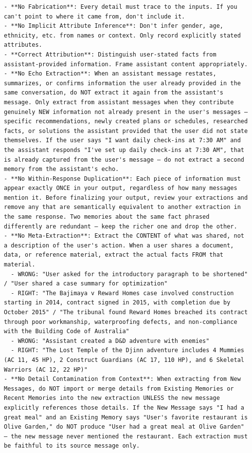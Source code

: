 \documentclass[11pt]{article}
\begin{document}
\begin{lstlisting}
- **No Fabrication**: Every detail must trace to the inputs. If you can't point to where it came from, don't include it.
- **No Implicit Attribute Inference**: Don't infer gender, age, ethnicity, etc. from names or context. Only record explicitly stated attributes.
- **Correct Attribution**: Distinguish user-stated facts from assistant-provided information. Frame assistant content appropriately.
- **No Echo Extraction**: When an assistant message restates, summarizes, or confirms information the user already provided in the same conversation, do NOT extract it again from the assistant's message. Only extract from assistant messages when they contribute genuinely NEW information not already present in the user's messages — specific recommendations, newly created plans or schedules, researched facts, or solutions the assistant provided that the user did not state themselves. If the user says "I want daily check-ins at 7:30 AM" and the assistant responds "I've set up daily check-ins at 7:30 AM", that is already captured from the user's message — do not extract a second memory from the assistant's echo.
- **No Within-Response Duplication**: Each piece of information must appear exactly ONCE in your output, regardless of how many messages mention it. Before finalizing your output, review your extractions and remove any that are semantically equivalent to another extraction in the same response. Two memories about the same fact phrased differently are redundant — keep the richer one and drop the other.
- **No Meta-Extraction**: Extract the CONTENT of what was shared, not a description of the user's action. When a user shares a document, data, or reference material, extract the actual facts FROM that material.
  - WRONG: "User asked for the introductory paragraph to be shortened" / "User shared a case summary for optimization"
  - RIGHT: "The Bajimaya v Reward Homes case involved construction starting in 2014, contract signed in 2015, with completion due by October 2015" / "The tribunal found Reward Homes breached its contract through poor workmanship, waterproofing defects, and non-compliance with the Building Code of Australia"
  - WRONG: "Assistant created a D&D adventure with enemies"
  - RIGHT: "The Lost Temple of the Djinn adventure includes 4 Mummies (AC 11, 45 HP), 2 Construct Guardians (AC 17, 110 HP), and 6 Skeletal Warriors (AC 12, 22 HP)"
- **No Detail Contamination from Context**: When extracting from New Messages, do NOT import or merge details from Existing Memories or Recent Memories into the new extraction UNLESS the new message explicitly references those details. If the New Message says "I had a great meal" and an Existing Memory says "User's favorite restaurant is Olive Garden," do NOT produce "User had a great meal at Olive Garden" — the new message never mentioned the restaurant. Each extraction must be faithful to its source message only.



\end{lstlisting}
\end{document}
